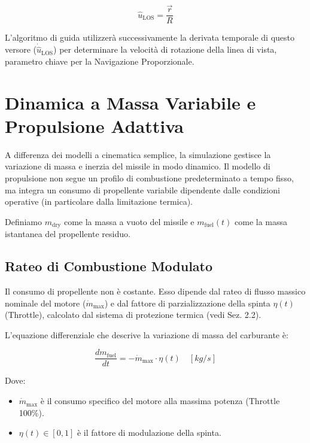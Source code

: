 \documentclass[12pt,a4paper]{article}
\begin{document}
\begin{equation}
    \hat{u}_{\text{LOS}} = \frac{\vec{r}}{R}
\end{equation}

L'algoritmo di guida utilizzerà successivamente la derivata temporale di questo versore ($\dot{\hat{u}}_{\text{LOS}}$) per determinare la velocità di rotazione della linea di vista, parametro chiave per la Navigazione Proporzionale.

\section{Dinamica a Massa Variabile e Propulsione Adattiva}

A differenza dei modelli a cinematica semplice, la simulazione gestisce la variazione di massa e inerzia del missile in modo dinamico. Il modello di propulsione non segue un profilo di combustione predeterminato a tempo fisso, ma integra un consumo di propellente variabile dipendente dalle condizioni operative (in particolare dalla limitazione termica).

Definiamo $m_{\text{dry}}$ come la massa a vuoto del missile e $m_{\text{fuel}}(t)$ come la massa istantanea del propellente residuo.

\subsection{Rateo di Combustione Modulato}
Il consumo di propellente non è costante. Esso dipende dal rateo di flusso massico nominale del motore ($\dot{m}_{\text{max}}$) e dal fattore di parzializzazione della spinta $\eta(t)$ (Throttle), calcolato dal sistema di protezione termica (vedi Sez. 2.2).

L'equazione differenziale che descrive la variazione di massa del carburante è:

\begin{equation}
    \frac{dm_{\text{fuel}}}{dt} = - \dot{m}_{\text{max}} \cdot \eta(t) \quad \left[\si{kg/s}\right]
\end{equation}

Dove:
\begin{itemize}
    \item $\dot{m}_{\text{max}}$ è il consumo specifico del motore alla massima potenza (Throttle 100\%).
    \item $\eta(t) \in [0, 1]$ è il fattore di modulazione della spinta.
\end{itemize}
\end{document}
